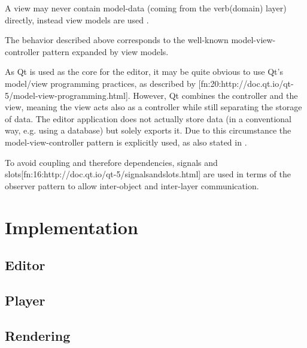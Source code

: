 \documentclass[
    a4paper,      %
    10pt,         %
    openright,    %
    notitlepage,  %
    parskip=half, %
]{scrreprt}       %
\theoremstyle{definition}                    %
\begin{document}
A view may never contain model-data (coming from the {{{verb(domain)}}} layer)
directly, instead view models are used \cite{martin_fowler_presentation_2004}.

The behavior described above corresponds to the well-known model-view-controller
pattern expanded by view models.

As Qt is used as the core for the editor, it may be quite obvious to use Qt's
model/view programming practices, as described by
[fn:20:http://doc.qt.io/qt-5/model-view-programming.html]. However, Qt combines
the controller and the view, meaning the view acts also as a controller while
still separating the storage of data. The editor application does not actually
store data (in a conventional way, e.g. using a database) but solely exports it.
Due to this circumstance the model-view-controller pattern is explicitly used,
as also stated in \cite[p. 38]{osterwalder_qde_2016}.


To avoid coupling and therefore dependencies, signals and
slots[fn:16:http://doc.qt.io/qt-5/signalsandslots.html] are used in terms of the
observer pattern to allow inter-object and inter-layer communication.%

\chapter{Implementation}
\label{chap:implementation}


\section{Editor}
\label{sec:editor}


\section{Player}
\label{sec:player}


\section{Rendering}
\label{sec:rendering}
\end{document}
